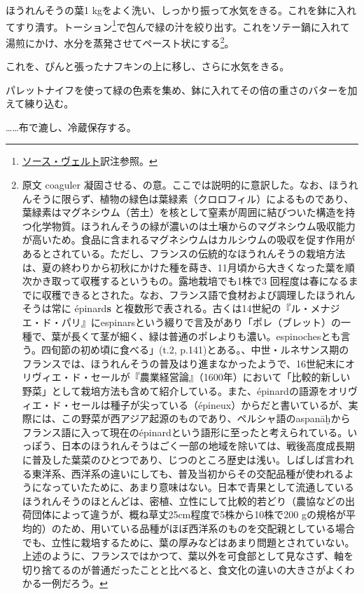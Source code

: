 \begin{recette}
ほうれんそうの葉1
kgをよく洗い、しっかり振って水気をきる。これを鉢に入れてすり潰す。トーション\footnote{\protect\hyperlink{sauce-verte}{ソース・ヴェルト}訳注参照。}で包んで緑の汁を絞り出す。これをソテー鍋に入れて湯煎にかけ、水分を蒸発させてペースト状にする\footnote{原文
  coaguler
  凝固させる、の意。ここでは説明的に意訳した。なお、ほうれんそうに限らず、植物の緑色は葉緑素（クロロフィル）によるものであり、葉緑素はマグネシウム（苦土）を核として窒素が周囲に結びついた構造を持つ化学物質。ほうれんそうの緑が濃いのは土壌からのマグネシウム吸収能力が高いため。食品に含まれるマグネシウムはカルシウムの吸収を促す作用があるとされている。ただし、フランスの伝統的なほうれんそうの栽培方法は、夏の終わりから初秋にかけた種を蒔き、11月頃から大きくなった葉を順次かき取って収穫するというもの。露地栽培でも1株で3
  回程度は春になるまでに収穫できるとされた。なお、フランス語で食材および調理したほうれんそうは常に
  épinard\textbf{s}
  と複数形で表される。古くは14世紀の『ル・メナジエ・ド・パリ』にespinarsという綴りで言及があり「ポレ（ブレット）の一種で、葉が長くて茎が細く、緑は普通のポレよりも濃い。espinochesとも言う。四旬節の初め頃に食べる」(t.2,
  p.141)とある。、中世・ルネサンス期のフランスでは、ほうれんそうの普及はり進まなかったようで、16世紀末にオリヴィエ・ド・セールが『農業経営論』（1600年）において「比較的新しい野菜」として栽培方法も含めて紹介している。また、épinardの語源をオリヴィエ・ド・セールは種子が尖っている（épineux）からだと書いているが、実際には、この野菜が西アジア起源のものであり、ペルシャ語のaspanāḫからフランス語に入って現在のépinardという語形に至ったと考えられている。いっぽう、日本のほうれんそうはごく一部の地域を除いては、戦後高度成長期に普及した葉菜のひとつであり、じつのところ歴史は浅い。しばしば言われる東洋系、西洋系の違いにしても、普及当初からその交配品種が使われるようになっていたために、あまり意味はない。日本で青果として流通しているほうれんそうのほとんどは、密植、立性にして比較的若どり（農協などの出荷団体によって違うが、概ね草丈25cm程度で5株から10株で200
  gの規格が平均的）のため、用いている品種がほぼ西洋系のものを交配親としている場合でも、立性に栽培するために、葉の厚みなどはあまり問題とされていない。上述のように、フランスではかつて、葉以外を可食部として見なさず、軸を切り捨てるのが普通だったことと比べると、食文化の違いの大きさがよくわかる一例だろう。}。

これを、ぴんと張ったナフキンの上に移し、さらに水気をきる。

パレットナイフを使って緑の色素を集め、鉢に入れてその倍の重さのバターを加えて練り込む。

\ldots{}\ldots{}布で漉し、冷蔵保存する。


\end{recette}
